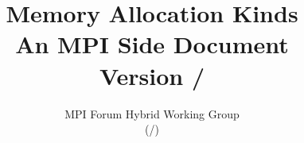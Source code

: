 \documentclass[twoside,11pt,fleqn]{book}
\def\disclaim{{%
  }}
\begin{document}
\title{Memory Allocation Kinds \\
{\Large An MPI Side Document}\\
{\Large Version \MEMALLOCVERSION/}\\
}

\author{
}

\date{
MPI Forum Hybrid Working Group\\
(\MEMALLOCDATE/)\\[2ex]
\vspace{0.2in}
}

\frontmatter
\maketitle

\pagestyle{plain} 
\setcounter{page}{2} 
\hfuzz=5pt
 
\newpage
\pagestyle{empty}
\contentstrue
\pagestyle{plain}
\tableofcontents
\contentsfalse

\ifodd\value{page}\else\hbox{}\thispagestyle{empty}\newpage\fi

\mainmatter  %
\withlinenumbers
\setpagewiselinenumbers
\linenumbers

\pagestyle{fancy}  
\fancyhf{}
\fancyfoot[C]{\thepage\\
\disclaim}

%

\startchap


\newpage 
\appendix

{}


\end{document}
